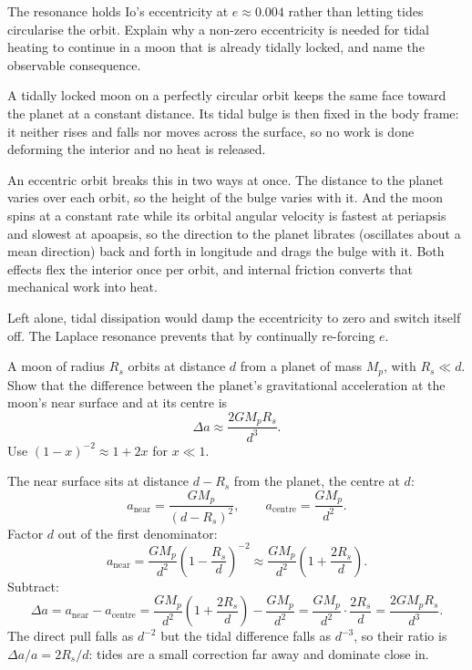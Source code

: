 \parti The resonance holds Io's eccentricity at $e \approx 0.004$ rather than letting tides
circularise the orbit. Explain why a non-zero eccentricity is needed for tidal heating to continue
in a moon that is already tidally locked, and name the observable consequence.

\begin{solution}
A tidally locked moon on a perfectly circular orbit keeps the same face toward the planet at a
constant distance. Its tidal bulge is then fixed in the body frame: it neither rises and falls nor
moves across the surface, so no work is done deforming the interior and no heat is released.

An eccentric orbit breaks this in two ways at once. The distance to the planet varies over each
orbit, so the height of the bulge varies with it. And the moon spins at a constant rate while its
orbital angular velocity is fastest at periapsis and slowest at apoapsis, so the direction to the
planet librates (oscillates about a mean direction) back and forth in longitude and drags the bulge with it. Both effects flex the
interior once per orbit, and internal friction converts that mechanical work into heat.

Left alone, tidal dissipation would damp the eccentricity to zero and switch itself off. The
Laplace resonance prevents that by continually re-forcing $e$.
\end{solution}



\parti A moon of radius $R_s$ orbits at distance $d$ from a planet of mass $M_p$, with
$R_s \ll d$. Show that the difference between the planet's gravitational acceleration at the moon's
near surface and at its centre is
\[
  \Delta a \approx \frac{2 G M_p R_s}{d^3}.
\]
Use $(1 - x)^{-2} \approx 1 + 2x$ for $x \ll 1$.

\begin{solution}
The near surface sits at distance $d - R_s$ from the planet, the centre at $d$:
\[
  a_{\mathrm{near}} = \frac{G M_p}{(d - R_s)^2},
  \qquad
  a_{\mathrm{centre}} = \frac{G M_p}{d^2}.
\]
Factor $d$ out of the first denominator:
\[
  a_{\mathrm{near}} = \frac{G M_p}{d^2}\left(1 - \frac{R_s}{d}\right)^{-2}
                    \approx \frac{G M_p}{d^2}\left(1 + \frac{2 R_s}{d}\right).
\]
Subtract:
\[
  \Delta a = a_{\mathrm{near}} - a_{\mathrm{centre}}
           = \frac{G M_p}{d^2}\left(1 + \frac{2 R_s}{d}\right) - \frac{G M_p}{d^2}
           = \frac{G M_p}{d^2} \cdot \frac{2 R_s}{d}
           = \frac{2 G M_p R_s}{d^3}.
\]
The direct pull falls as $d^{-2}$ but the tidal difference falls as $d^{-3}$, so their ratio is
$\Delta a / a = 2 R_s / d$: tides are a small correction far away and dominate close in.
\end{solution}

